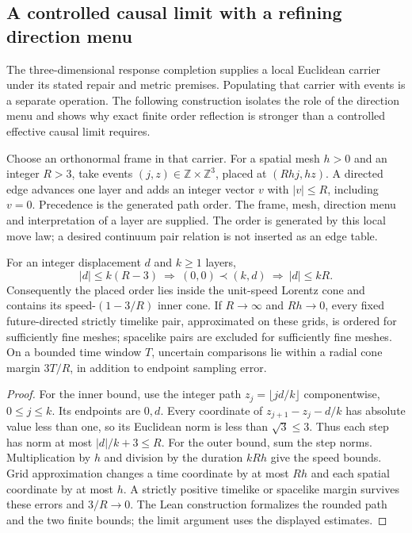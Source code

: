 \subsection{A controlled causal limit with a refining direction menu}
\label{sec:refining-causal-cone}

The three-dimensional response completion supplies a local Euclidean
carrier under its stated repair and metric premises. Populating that carrier
with events is a separate operation. The following construction isolates
the role of the direction menu and shows why exact finite order reflection
is stronger than a controlled effective causal limit requires.

Choose an orthonormal frame in that carrier. For a spatial mesh $h>0$ and
an integer $R>3$, take events $(j,z)\in\mathbb Z\times\mathbb Z^3$, placed at
$(Rhj,hz)$. A directed edge advances one layer and adds an integer vector
$v$ with $|v|\le R$, including $v=0$. Precedence is the generated path order.
The frame, mesh, direction menu and interpretation of a layer are supplied.
The order is generated by this local move law; a desired continuum pair
relation is not inserted as an edge table.

\begin{proposition}
\label{prop:refining-causal-cone}
For an integer displacement $d$ and $k\ge1$ layers,
\[
 |d|\le k(R-3)\ \Longrightarrow\ (0,0)\prec(k,d)
 \ \Longrightarrow\ |d|\le kR.
\]
Consequently the placed order lies inside the unit-speed Lorentz cone and
contains its speed-$(1-3/R)$ inner cone. If $R\to\infty$ and $Rh\to0$,
every fixed future-directed strictly timelike pair, approximated on these grids, is ordered
for sufficiently fine meshes; spacelike pairs are excluded for sufficiently
fine meshes. On a bounded time window $T$, uncertain comparisons lie within
a radial cone margin $3T/R$, in addition to endpoint sampling error.
\end{proposition}

\begin{proof}
For the inner bound, use the integer path
$z_j=\lfloor jd/k\rfloor$ componentwise, $0\le j\le k$.
Its endpoints are $0,d$. Every coordinate of
$z_{j+1}-z_j-d/k$ has absolute value less than one, so its Euclidean norm
is less than $\sqrt3\le3$. Thus each step has norm at most
$|d|/k+3\le R$. For the outer bound, sum the step norms.
Multiplication by $h$ and division by the duration $kRh$ give the speed
bounds. Grid approximation changes a time coordinate by at most $Rh$ and
each spatial coordinate by at most $h$. A strictly positive timelike or
spacelike margin survives these errors and $3/R\to0$.
The Lean construction formalizes the rounded path and the two finite bounds;
the limit argument uses the displayed estimates.
\end{proof}

